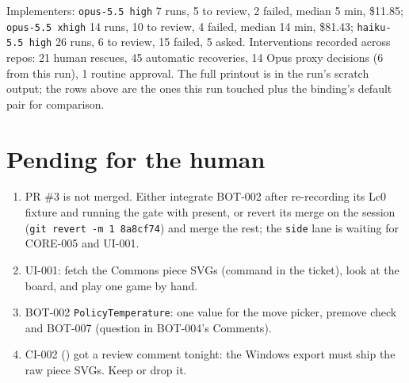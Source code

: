 \documentclass[11pt,a4paper]{article}
\begin{document}
\medskip
Implementers: \texttt{opus-5.5 high} 7 runs, 5 to review, 2 failed, median 5 min, \$11.85;
\texttt{opus-5.5 xhigh} 14 runs, 10 to review, 4 failed, median 14 min, \$81.43;
\texttt{haiku-5.5 high} 26 runs, 6 to review, 15 failed, 5 asked. Interventions recorded
across repos: 21 human rescues, 45 automatic recoveries, 14 Opus proxy decisions (6 from
this run), 1 routine approval. The full printout is in the run's scratch output; the rows
above are the ones this run touched plus the binding's default pair for comparison.

\section*{Pending for the human}

\begin{enumerate}
  \item PR \#3 is not merged. Either integrate BOT-002 after re-recording its Lc0 fixture and
        running the gate with  present, or revert its merge on the session
        (\texttt{git revert -m 1 8a8cf74}) and merge the rest; the \texttt{side} lane is
        waiting for CORE-005 and UI-001.
  \item UI-001: fetch the Commons piece SVGs (command in the ticket), look at the board, and
        play one game by hand.
  \item BOT-002 \texttt{PolicyTemperature}: one value for the move picker, premove check and
        BOT-007 (question in BOT-004's Comments).
  \item CI-002 () got a review comment tonight: the Windows export must
        ship the raw piece SVGs. Keep or drop it.
\end{enumerate}
\end{document}
